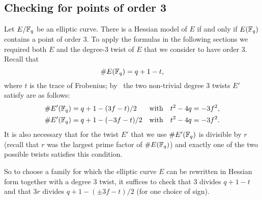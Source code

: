 \subsection{Checking for points of order 3}\label{twist}

Let $E/\mathbb{F}_{q}$ be an elliptic curve. There is a Hessian model of $E$ if and only if $E(\mathbb{F}_{q})$ contains a point of order 3. 
To apply the formulas in the following sections we required both $E$ and the 
degree-3 twist of $E$ that we consider to have order 3.
Recall that
\[\#E(\mathbb{F}_{q}) = q+1-t,\]
where $t$ is the trace of Frobenius; 
by~\cite{2006/hess} the two non-trivial degree 3 twists $E'$ satisfy are as follows:
\begin{align*}
\# E' (\mathbb{F}_{q}) &= q + 1 - (3f - t) / 2 & \text{with} & \quad t^2 - 4q = -3f^2, \\
\# E' (\mathbb{F}_{q}) &= q + 1 - (-3f- t) / 2 & \text{with} & \quad t^2 - 4q = -3f^2.
\end{align*}
It is also necessary that for the twist $E'$ that we use $\#E'(\mathbb{F}_{q})$ is divisible by $r$ (recall that $r$ was the largest prime factor of $\# E(\mathbb{F}_{q})$) and exactly one of the two possible twists satisfies this condition.

So to choose a family for which the elliptic curve $E$ can be rewritten in Hessian form together with a degree 3 twist, it suffices to check that 3 divides $q+1-t$ and that $3r$ divides $q + 1 - (\pm 3f - t) / 2$ (for one choice of sign).




